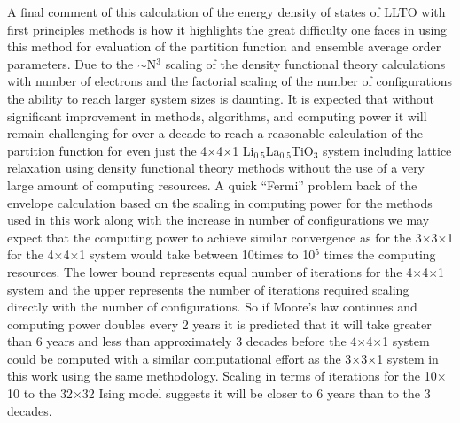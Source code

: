 \documentclass[aps,pre,reprint,superscriptaddress,showkeys]{revtex4-2}
\begin{document}
A final comment of this calculation of the energy density of states of LLTO with first principles methods is how it highlights the great difficulty one faces in using this method for evaluation of the partition function and ensemble average order parameters. Due to the $\sim$N$^3$ scaling of the density functional theory calculations with number of electrons and the factorial scaling of the number of configurations the ability to reach larger system sizes is daunting. It is expected that without significant improvement in methods, algorithms, and computing power it will remain challenging for over a decade to reach  a reasonable calculation of the partition function for even just the 4$\times$4$\times$1 Li$_{0.5}$La$_{0.5}$TiO$_3$ system including lattice relaxation using density functional theory methods without the use of a very large amount of computing resources. A quick ``Fermi'' problem back of the envelope calculation based on the scaling in computing power for the methods used in this work along with the increase in number of configurations we may expect that the computing  power to achieve similar convergence as for the 3$\times$3$\times$1 for the 4$\times$4$\times$1 system would take between 10times to 10$^5$ times  the computing resources. The lower bound represents equal number of iterations for the 4$\times$4$\times$1 system and the upper represents the number of iterations required scaling directly with the number of configurations.  So if Moore's law continues and computing power doubles every 2 years it is predicted that it will take greater than 6 years and less than approximately 3 decades before the 4$\times$4$\times$1 system could be computed with a similar computational effort as the 3$\times$3$\times$1 system in this work using the same methodology. Scaling in terms of iterations for the  10$\times$10  to the 32$\times$32 Ising model suggests it will be closer to 6 years than to the 3 decades. 
\end{document}
